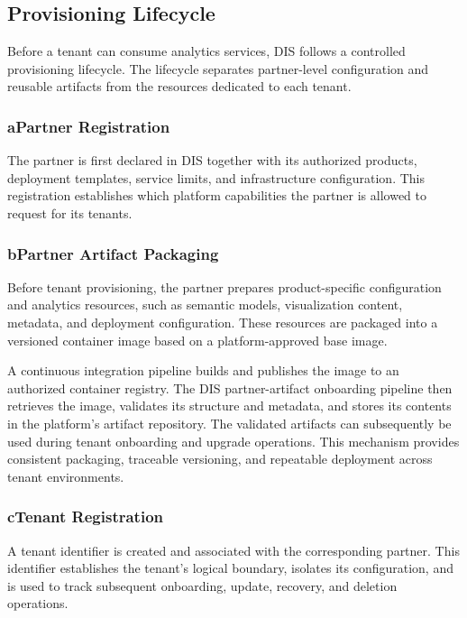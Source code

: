 \subsection{Provisioning Lifecycle}

Before a tenant can consume analytics services, DIS follows a controlled
provisioning lifecycle. The lifecycle separates partner-level configuration
and reusable artifacts from the resources dedicated to each tenant.

\subsubsection*{a\quad Partner Registration}

The partner is first declared in DIS together with its authorized products,
deployment templates, service limits, and infrastructure configuration. This
registration establishes which platform capabilities the partner is allowed
to request for its tenants.

\subsubsection*{b\quad Partner Artifact Packaging}

Before tenant provisioning, the partner prepares product-specific
configuration and analytics resources, such as semantic models,
visualization content, metadata, and deployment configuration. These
resources are packaged into a versioned container image based on a
platform-approved base image.

A continuous integration pipeline builds and publishes the image to an
authorized container registry. The DIS partner-artifact onboarding pipeline
then retrieves the image, validates its structure and metadata, and stores
its contents in the platform's artifact repository. The validated artifacts
can subsequently be used during tenant onboarding and upgrade operations.
This mechanism provides consistent packaging, traceable versioning, and
repeatable deployment across tenant environments.

\subsubsection*{c\quad Tenant Registration}

A tenant identifier is created and associated with the corresponding partner.
This identifier establishes the tenant's logical boundary, isolates its
configuration, and is used to track subsequent onboarding, update, recovery,
and deletion operations.

